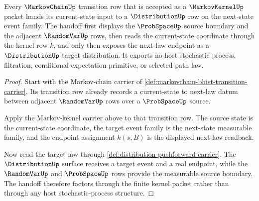 \begin{theorem}
\label{thm:markov-kernel-transition-distribution-handoff}
Every $\MarkovChainUp$ transition row that is accepted as a $\MarkovKernelUp$ packet hands its current-state input to a $\DistributionUp$ row on the next-state event family. The handoff first displays the $\ProbSpaceUp$ source boundary and the adjacent $\RandomVarUp$ rows, then reads the current-state coordinate through the kernel row $k$, and only then exposes the next-law endpoint as a $\DistributionUp$ target distribution. It exports no host stochastic process, filtration, conditional-expectation primitive, or selected path law.
\end{theorem}
\begin{proof}
Start with the Markov-chain carrier of \autoref{def:markovchain-bhist-transition-carrier}. Its transition row already records a current-state to next-law datum between adjacent $\RandomVarUp$ rows over a $\ProbSpaceUp$ source.

Apply the Markov-kernel carrier above to that transition row. The source state is the current-state coordinate, the target event family is the next-state measurable family, and the endpoint assignment $k(s,B)$ is the displayed next-law readback.

Now read the target law through \autoref{def:distribution-pushforward-carrier}. The $\DistributionUp$ surface receives a target event and a real endpoint, while the $\RandomVarUp$ and $\ProbSpaceUp$ rows provide the measurable source boundary. The handoff therefore factors through the finite kernel packet rather than through any host stochastic-process structure.
\end{proof}


\begin{closurestatus}{\MarkovKernelUp}
  \theoryclosure{\seedClosure}
  \formalstatus{\unformalizedV}
\end{closurestatus}
